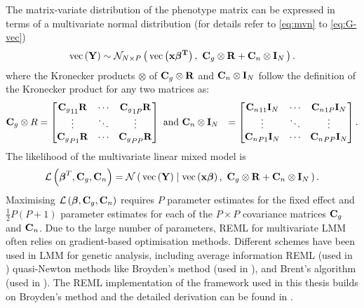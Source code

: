% 
The matrix-variate distribution of the phenotype matrix  can be expressed in terms of a multivariate normal distribution (for details refer to \cref{eq:mvn} to \cref{eq:G-vec})
%
\begin{equation}
\text{vec}\left(\boldsymbol{\mathbf{Y}}\right) \sim \mathcal{N}_{N\times P}\left(\, {\text{vec}\left(\boldsymbol{\mathbf{x}}\boldsymbol{\mathbf{\beta^T}}\right)} \,,~{\boldsymbol{\mathbf{C}}_g \otimes \boldsymbol{\mathbf{R}} + \boldsymbol{\mathbf{C}}_n \otimes\boldsymbol{\mathbf{I}}_N} \,\right).
\label{eq:lmm-mv-multin}
\end{equation}
%
where the Kronecker products \(\otimes\) of \(\boldsymbol{\mathbf{C}}_g \otimes \boldsymbol{\mathbf{R}}\) and \(\boldsymbol{\mathbf{C}}_n \otimes\boldsymbol{\mathbf{I}}_N\)  follow the definition of the Kronecker product for any two matrices as:
\begin{align*}
 \boldsymbol{\mathbf{C}}_g \otimes R &=
  \begin{bmatrix}
  {\boldsymbol{\mathbf{C}}_g}_{11}\boldsymbol{\mathbf{R}}  &  \cdots &  {\boldsymbol{\mathbf{C}}_g}_{1P}\boldsymbol{\mathbf{R}}  \\
   \vdots &  \ddots & \vdots \\
  {\boldsymbol{\mathbf{C}}_g}_{P1}\boldsymbol{\mathbf{R}}  &  \cdots &  {\boldsymbol{\mathbf{C}}_g}_{PP}\boldsymbol{\mathbf{R}}  \\
   \end{bmatrix} \text{ and }
    \boldsymbol{\mathbf{C}}_n \otimes  \boldsymbol{\mathbf{I}}_N&=
  \begin{bmatrix}
  {\boldsymbol{\mathbf{C}}_n}_{11}\boldsymbol{\mathbf{I}}_N &  \cdots &  {\boldsymbol{\mathbf{C}}_n}_{1P}\boldsymbol{\mathbf{I}}_N  \\
   \vdots &  \ddots & \vdots \\
  {\boldsymbol{\mathbf{C}}_n}_{P1}\boldsymbol{\mathbf{I}}_N  &  \cdots &  {\boldsymbol{\mathbf{C}}_n}_{PP}\boldsymbol{\mathbf{I}}_N  \\
   \end{bmatrix}.
\end{align*}
%
The likelihood of the multivariate linear mixed model is
%
\begin{equation}
\mathcal{L}\left(\boldsymbol{\mathbf{\beta}}^T, \boldsymbol{\mathbf{C}}_g, \boldsymbol{\mathbf{C}}_n\right) = \mathcal{N}\left(\,{\text{vec}\left(\boldsymbol{\mathbf{Y}}\right) \mid \text{vec}\left(\boldsymbol{\mathbf{x}}\boldsymbol{\mathbf{\beta}}\right)}\,,~{\boldsymbol{\mathbf{C}}_g \otimes\boldsymbol{\mathbf{R}} + \boldsymbol{\mathbf{C}}_n \otimes\boldsymbol{\mathbf{I}}_N}\,\right).
\label{eq:lmm-mv-likelihood}
\end{equation}
%
Maximising \(\mathcal{L}\left(\boldsymbol{\mathbf{\beta}}, \boldsymbol{\mathbf{C}}_g, \boldsymbol{\mathbf{C}}_n\right)\) requires \(P\) parameter estimates for the fixed effect \tmat{\beta} and \(\frac{1}{2}P \left( P + 1\right)\) parameter estimates for each of the \(P \times P\) covariance matrices \(\boldsymbol{\mathbf{C}}_g\) and  \(\boldsymbol{\mathbf{C}}_n\). Due to the large number of parameters, REML for multivariate LMM often relies on gradient-based optimisation methods. Different schemes have been used in LMM for genetic analysis, including average information REML \citep{Gilmour1995} (used in \citep{Yang2011}) quasi-Newton methods like Broyden's method \citep{Broyden1965} (used in \citep{Casale2015}), and Brent's algorithm \citep{Brent1971} (used in \citep{Lippert2011,Svishcheva2012}). The REML implementation of the framework used in this thesis builds on Broyden's method and the detailed derivation can be found in \citep[Supplementary material]{Casale2015}.


